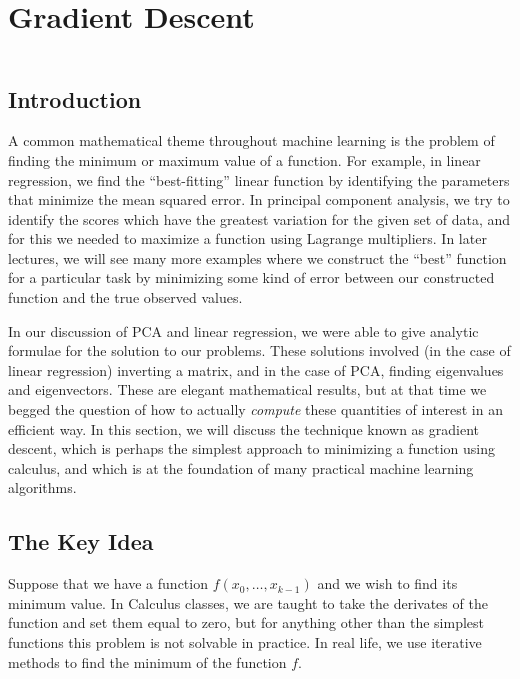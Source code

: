 \documentclass[
  11pt,
  letterpaper,
]{scrbook}
\newcommand{\df}[1]{\frac{\partial}{\partial #1}}
\newcommand{\R}{\mathbf{R}}
\theoremstyle{plain}
\theoremstyle{plain}
\theoremstyle{remark}
\begin{document}

\hypertarget{sec-gradient_descent}{%
\chapter{Gradient Descent}\label{sec-gradient_descent}}

\[\newcommand{\df}[1]{\frac{\partial}{\partial #1}}\]
\[\newcommand{\R}{\mathbf{R}}\]

\hypertarget{introduction-3}{%
\section{Introduction}\label{introduction-3}}

A common mathematical theme throughout machine learning is the problem
of finding the minimum or maximum value of a function. For example, in
linear regression, we find the ``best-fitting'' linear function by
identifying the parameters that minimize the mean squared error. In
principal component analysis, we try to identify the scores which have
the greatest variation for the given set of data, and for this we needed
to maximize a function using Lagrange multipliers. In later lectures, we
will see many more examples where we construct the ``best'' function for
a particular task by minimizing some kind of error between our
constructed function and the true observed values.

In our discussion of PCA and linear regression, we were able to give
analytic formulae for the solution to our problems. These solutions
involved (in the case of linear regression) inverting a matrix, and in
the case of PCA, finding eigenvalues and eigenvectors. These are elegant
mathematical results, but at that time we begged the question of how to
actually \emph{compute} these quantities of interest in an efficient
way. In this section, we will discuss the technique known as gradient
descent, which is perhaps the simplest approach to minimizing a function
using calculus, and which is at the foundation of many practical machine
learning algorithms.

\hypertarget{the-key-idea}{%
\section{The Key Idea}\label{the-key-idea}}

Suppose that we have a function \(f(x_0,\ldots, x_{k-1})\) and we wish
to find its minimum value. In Calculus classes, we are taught to take
the derivates of the function and set them equal to zero, but for
anything other than the simplest functions this problem is not solvable
in practice. In real life, we use iterative methods to find the minimum
of the function \(f\).
\end{document}
